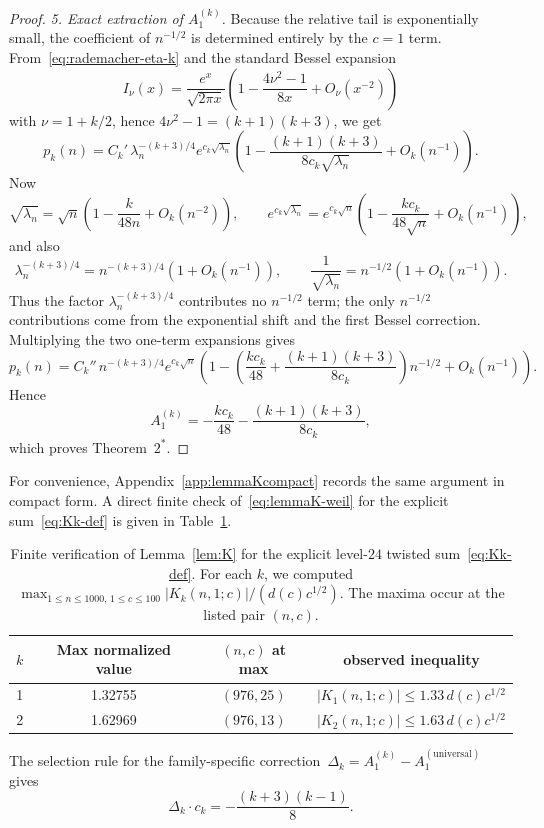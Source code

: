 \documentclass[11pt,a4paper]{article}
\begin{document}
\begin{proof}
\smallskip
\noindent\emph{5. Exact extraction of $A_1^{(k)}$.}
Because the relative tail is exponentially small, the coefficient of $n^{-1/2}$ is determined entirely by the $c=1$ term. From~\eqref{eq:rademacher-eta-k} and the standard Bessel expansion
\[
  I_\nu(x)=\frac{e^x}{\sqrt{2\pi x}}
  \left(1-\frac{4\nu^2-1}{8x}+O_\nu(x^{-2})\right)
\]
with $\nu=1+k/2$, hence $4\nu^2-1=(k+1)(k+3)$, we get
\[
  p_k(n)=C_k'\,\lambda_n^{-(k+3)/4}e^{c_k\sqrt{\lambda_n}}
  \left(1-\frac{(k+1)(k+3)}{8c_k\sqrt{\lambda_n}}+O_k(n^{-1})\right).
\]
Now
\[
  \sqrt{\lambda_n}=\sqrt n\left(1-\frac{k}{48n}+O_k(n^{-2})\right),
\qquad
  e^{c_k\sqrt{\lambda_n}}=e^{c_k\sqrt n}\left(1-\frac{k c_k}{48\sqrt n}+O_k(n^{-1})\right),
\]
and also
\[
  \lambda_n^{-(k+3)/4}=n^{-(k+3)/4}(1+O_k(n^{-1})),
  \qquad
  \frac{1}{\sqrt{\lambda_n}}=n^{-1/2}(1+O_k(n^{-1})).
\]
Thus the factor $\lambda_n^{-(k+3)/4}$ contributes no $n^{-1/2}$ term; the only $n^{-1/2}$ contributions come from the exponential shift and the first Bessel correction. Multiplying the two one-term expansions gives
\[
  p_k(n)=C_k''\,n^{-(k+3)/4}e^{c_k\sqrt n}
  \left(1-
    \left(\frac{k c_k}{48}+\frac{(k+1)(k+3)}{8c_k}\right)n^{-1/2}
    + O_k(n^{-1})
  \right).
\]
Hence
\[
  A_1^{(k)}=-\frac{k c_k}{48}-\frac{(k+1)(k+3)}{8c_k},
\]
which proves Theorem~$2^*$.
\end{proof}

For convenience, Appendix~\ref{app:lemmaKcompact} records the same argument in compact form. A direct finite check of~\eqref{eq:lemmaK-weil} for the explicit sum~\eqref{eq:Kk-def} is given in Table~\ref{tab:lemmaK}.

\begin{table}[ht]
\centering
\caption{Finite verification of Lemma~\ref{lem:K} for the explicit level-$24$ twisted sum~\eqref{eq:Kk-def}. For each $k$, we computed
$\max_{1\le n\le1000,\,1\le c\le100}|K_k(n,1;c)|/(d(c)c^{1/2})$.
The maxima occur at the listed pair $(n,c)$.}
\label{tab:lemmaK}
\begin{tabular}{@{}cccc@{}}
\toprule
$k$ & Max normalized value & $(n,c)$ at max & observed inequality \\
\midrule
1 & 1.32755 & $(976,25)$ & $|K_1(n,1;c)|\le 1.33\,d(c)c^{1/2}$ \\
2 & 1.62969 & $(976,13)$ & $|K_2(n,1;c)|\le 1.63\,d(c)c^{1/2}$ \\
\bottomrule
\end{tabular}
\end{table}

The selection rule for the family-specific correction~$\Delta_k = A_1^{(k)} - A_1^{(\mathrm{universal})}$ gives
\begin{equation}\label{eq:delta_k}
  \Delta_k \cdot c_k = -\frac{(k+3)(k-1)}{8}.
\end{equation}
\end{document}
